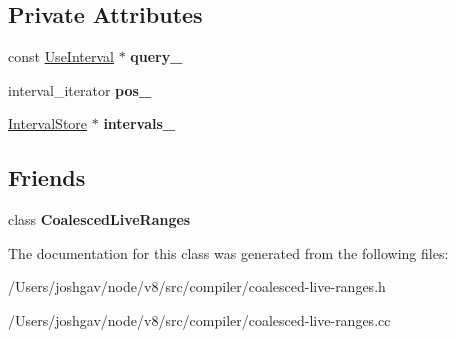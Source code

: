 \subsection*{Private Attributes}
\begin{DoxyCompactItemize}
\item 
const \hyperlink{classv8_1_1internal_1_1compiler_1_1_use_interval}{Use\+Interval} $\ast$ {\bfseries query\+\_\+}\hypertarget{classv8_1_1internal_1_1compiler_1_1_live_range_conflict_iterator_a84c863150b1974c914872ce8d8bb8ade}{}\label{classv8_1_1internal_1_1compiler_1_1_live_range_conflict_iterator_a84c863150b1974c914872ce8d8bb8ade}

\item 
interval\+\_\+iterator {\bfseries pos\+\_\+}\hypertarget{classv8_1_1internal_1_1compiler_1_1_live_range_conflict_iterator_a048bec1054263c3742c8b5756afd6da6}{}\label{classv8_1_1internal_1_1compiler_1_1_live_range_conflict_iterator_a048bec1054263c3742c8b5756afd6da6}

\item 
\hyperlink{classv8_1_1internal_1_1_zone_set}{Interval\+Store} $\ast$ {\bfseries intervals\+\_\+}\hypertarget{classv8_1_1internal_1_1compiler_1_1_live_range_conflict_iterator_a6a7edb9bf54e1c23b7f2bdaa36a65d24}{}\label{classv8_1_1internal_1_1compiler_1_1_live_range_conflict_iterator_a6a7edb9bf54e1c23b7f2bdaa36a65d24}

\end{DoxyCompactItemize}
\subsection*{Friends}
\begin{DoxyCompactItemize}
\item 
class {\bfseries Coalesced\+Live\+Ranges}\hypertarget{classv8_1_1internal_1_1compiler_1_1_live_range_conflict_iterator_ac1d9e941686bd3666209d22d4768bece}{}\label{classv8_1_1internal_1_1compiler_1_1_live_range_conflict_iterator_ac1d9e941686bd3666209d22d4768bece}

\end{DoxyCompactItemize}


The documentation for this class was generated from the following files\+:\begin{DoxyCompactItemize}
\item 
/\+Users/joshgav/node/v8/src/compiler/coalesced-\/live-\/ranges.\+h\item 
/\+Users/joshgav/node/v8/src/compiler/coalesced-\/live-\/ranges.\+cc\end{DoxyCompactItemize}
